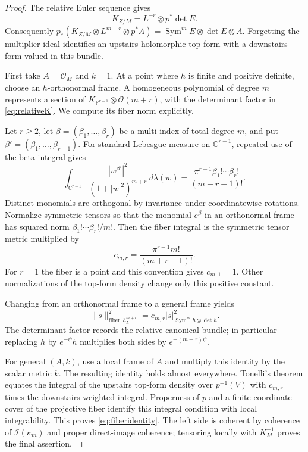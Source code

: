 \documentclass[11pt,reqno]{amsart}
\numberwithin{equation}{section}
\theoremstyle{definition}
\theoremstyle{remark}
\newcommand{\OO}{\mathcal O}
\newcommand{\II}{\mathcal I}
\newcommand{\PP}{\mathbb P}
\newcommand{\CC}{\mathbb C}
\newcommand{\Sym}{\operatorname{Sym}}
\begin{document}
\begin{proof}
The relative Euler sequence gives
\begin{equation}\label{eq:relativeK}
 K_{Z/M}=L^{-r}\otimes p^*\det E.
\end{equation}
Consequently $p_*(K_{Z/M}\otimes L^{m+r}\otimes p^*A)=\Sym^mE\otimes\det E\otimes A$. Forgetting the multiplier ideal identifies an upstairs holomorphic top form with a downstairs form valued in this bundle.

First take $A=\OO_M$ and $k=1$. At a point where $h$ is finite and positive definite, choose an $h$-orthonormal frame. A homogeneous polynomial of degree $m$ represents a section of $K_{\PP^{r-1}}\otimes\OO(m+r)$, with the determinant factor in \eqref{eq:relativeK}. We compute its fiber norm explicitly.

Let $r\geq2$, let $\beta=(\beta_1,\ldots,\beta_r)$ be a multi-index of total degree $m$, and put $\beta'=(\beta_1,\ldots,\beta_{r-1})$. For standard Lebesgue measure on $\CC^{r-1}$, repeated use of the beta integral gives
\begin{equation}\label{eq:beta-integral}
 \int_{\CC^{r-1}}
 \frac{|w^{\beta'}|^2}{(1+|w|^2)^{m+r}}\,d\lambda(w)
 =\frac{\pi^{r-1}\beta_1!\cdots\beta_r!}{(m+r-1)!}.
\end{equation}
Distinct monomials are orthogonal by invariance under coordinatewise rotations. Normalize symmetric tensors so that the monomial $e^\beta$ in an orthonormal frame has squared norm $\beta_1!\cdots\beta_r!/m!$. Then the fiber integral is the symmetric tensor metric multiplied by
\[
 c_{m,r}=\frac{\pi^{r-1}m!}{(m+r-1)!}.
\]
For $r=1$ the fiber is a point and this convention gives $c_{m,1}=1$. Other normalizations of the top-form density change only this positive constant.

Changing from an orthonormal frame to a general frame yields
\begin{equation}\label{eq:integral}
 \|s\|_{\mathrm{fiber},h_L^{m+r}}^2
       =c_{m,r}|s|_{\Sym^mh\otimes\det h}^2.
\end{equation}
The determinant factor records the relative canonical bundle; in particular replacing $h$ by $e^{-\psi}h$ multiplies both sides by $e^{-(m+r)\psi}$.

For general $(A,k)$, use a local frame of $A$ and multiply this identity by the scalar metric $k$. The resulting identity holds almost everywhere. Tonelli's theorem equates the integral of the upstairs top-form density over $p^{-1}(V)$ with $c_{m,r}$ times the downstairs weighted integral. Properness of $p$ and a finite coordinate cover of the projective fiber identify this integral condition with local integrability. This proves \eqref{eq:fiberidentity}. The left side is coherent by coherence of $\II(\kappa_m)$ and proper direct-image coherence; tensoring locally with $K_M^{-1}$ proves the final assertion.
\end{proof}
\end{document}
